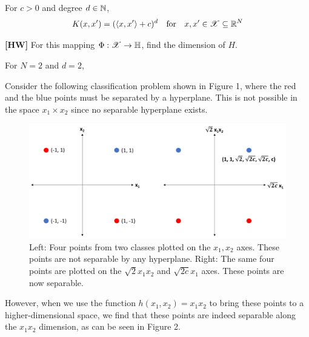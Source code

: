 \documentclass[a4paper,english,12pt]{article}
\begin{document}
\begin{exmp}
	
For $c>0$ and degree $d \in \mathbb{N}$,
\[K(x,x') = (\langle x, x' \rangle + c)^d ~~~ \text{for} ~~~ x,x' \in \mathscr{X} \subseteq \mathbb{R}^N\]

\textbf{[HW]} For this mapping $\Phi: \mathscr{X} \to \mathbb{H}$, find the dimension of $H$.

For $N=2$ and $d=2$,

Consider the following classification problem shown in Figure 1, where the red and the blue points must be separated by a hyperplane. This is not possible in the space $x_1 \times x_2$ since no separable hyperplane exists. 

\begin{figure}[h]
	\includegraphics[scale=0.5]{Figures/kernel-methods-polynomial-kernel}
	\centering
	\caption{Left: Four points from two classes plotted on the $x_1, x_2$ axes. These points are not separable by any hyperplane. Right: The same four points are plotted on the $\sqrt{2} x_1 x_2$ and $\sqrt{2c} x_1$ axes. These points are now separable.}
\end{figure}
However, when we use the function $h(x_1,x_2) = x_1 x_2$ to bring these points to a higher-dimensional space, we find that these points are indeed separable along the $x_1 x_2$ dimension, as can be seen in Figure 2.

\end{exmp}
\end{document}
